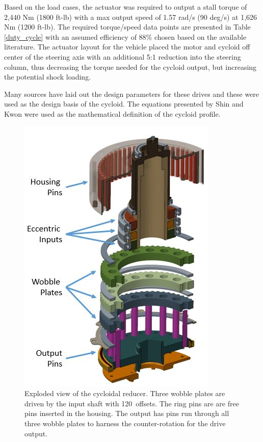 Based on the load cases, the actuator was required to output a stall torque of 2,440 Nm (1800 ft-lb) with a max output speed of 1.57 rad/s (90 deg/s) at 1,626 Nm (1200 ft-lb).
The required torque/speed data points are presented in Table \ref{duty_cycle} with an assumed efficiency of 88\% chosen based on the available literature.
The actuator layout for the vehicle placed the motor and cycloid off center of the steering axis with an additional 5:1 reduction into the steering column, thus decreasing the torque needed for the cycloid output, but increasing the potential shock loading.

Many sources have laid out the design parameters for these drives and these were used as the design basis of the cycloid.
The equations presented by Shin and Kwon \cite{on_the_lobe} were used as the mathematical definition of the cycloid profile.

\begin{figure}[!b]
	\centering
	\includegraphics[width=0.7\linewidth]{images/exploded_labeled}
	\caption{Exploded view of the cycloidal reducer.
		Three wobble plates are driven by the input shaft with 120\textdegree\ offsets.
		The ring pins are are free pins inserted in the housing.
		The output has pins run through all three wobble plates to harness the counter-rotation for the drive output.}
	\label{cycloid_exploded}
\end{figure}

